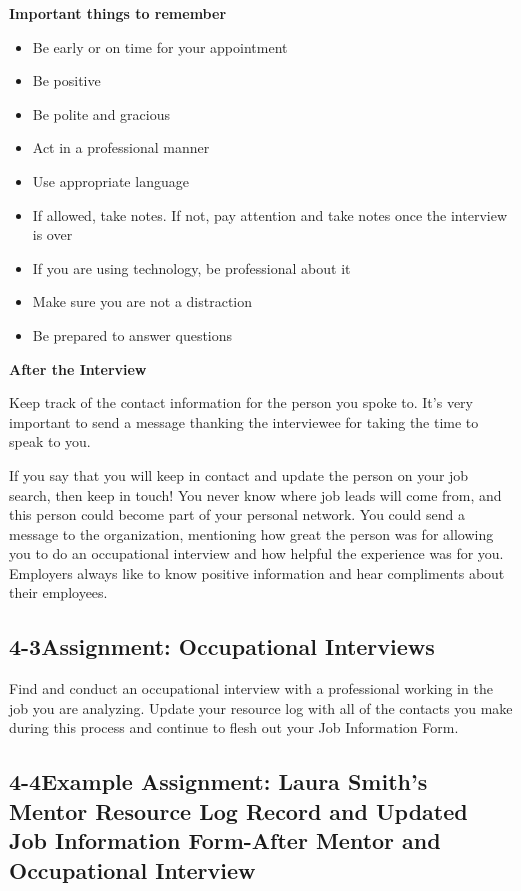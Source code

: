 \textbf{Important things to remember}
\begin{itemize}[leftmargin=*]
\item Be early or on time for your appointment
\item Be positive
\item Be polite and gracious
\item Act in a professional manner
\item Use appropriate language
\item If allowed, take notes. If not, pay attention and take notes once the interview is over
\item If you are using technology, be professional about it
\item Make sure you are not a distraction
\item Be prepared to answer questions
\end{itemize}
\textbf{After the Interview}

Keep track of the contact information for the person you spoke to. It's very important to send a message thanking the interviewee for taking the time to speak to you.

If you say that you will keep in contact and update the person on your job search, then keep in touch! You never know where job leads will come from, and this person could become part of your personal network. You could send a message to the organization, mentioning how great the person was for allowing you to do an occupational interview and how helpful the experience was for you. Employers always like to know positive information and hear compliments about their employees.

\pagebreak \subsection*{4-3\quad  Assignment: Occupational Interviews}
Find and conduct an occupational interview with a professional working in the job you are analyzing. Update your resource log with all of the contacts you make during this process and continue to flesh out your Job Information Form.

\pagebreak \subsection*{4-4\quad  Example Assignment: Laura Smith’s Mentor Resource Log Record and Updated Job Information Form-After Mentor and Occupational Interview}

